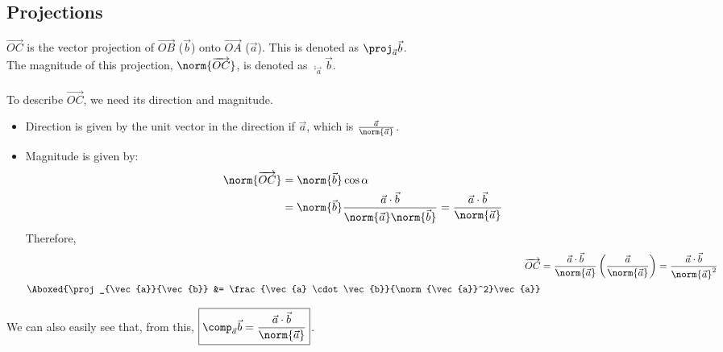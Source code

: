 \documentclass[12pt]{article}
\begin{document}
\subsection{Projections}
\begin{figure}[h!]
\centering
{}
\end{figure}
$\overrightarrow{OC}$ is the vector projection  of $\overrightarrow{OB}$ ($\vec{b}$) onto $\overrightarrow{OA}$ ($\vec{a}$). This is denoted as $\proj_{\vec{a}}{\vec{b}}$. \\
The magnitude of this projection, $\norm{\overrightarrow{OC}}$, is denoted as $\comp_{\vec{a}}{\vec{b}}$. \\ \\
To describe $\overrightarrow{OC}$, we need its direction and magnitude.
\begin{itemize}
\item Direction is given by the unit vector in the direction if $\vec{a}$, which is $\frac{\vec{a}}{\norm{\vec{a}}}$.
\item Magnitude is given by:
\[
\begin{aligned}
\norm{\overrightarrow{OC}} &= \norm{\vec{b}}\cos{\alpha} \\
&= \norm{\vec{b}} \frac{\vec{a} \cdot \vec{b}}{\norm{\vec{a}}\norm{\vec{b}}} = \frac{\vec{a} \cdot \vec{b}}{\norm{\vec{a}}}
\end{aligned}
\]
Therefore, \[ 
\begin{aligned}
\overrightarrow{OC} &= \frac{\vec{a} \cdot \vec{b}}{\norm{\vec{a}}}\left(\frac{\vec{a}}{\norm{\vec{a}}}\right) = \frac{\vec{a} \cdot \vec{b}}{\norm{\vec{a}}^2} \\ 
\Aboxed{\proj_{\vec{a}}{\vec{b}} &= \frac{\vec{a} \cdot \vec{b}}{\norm{\vec{a}}^2}\vec{a}}
\end{aligned}
\]
\end{itemize}

We can also easily see that, from this,  $\boxed{\comp_{\vec{a}}{\vec{b}} = \dfrac{\vec{a} \cdot \vec{b}}{\norm{\vec{a}}}}$.
\end{document}
